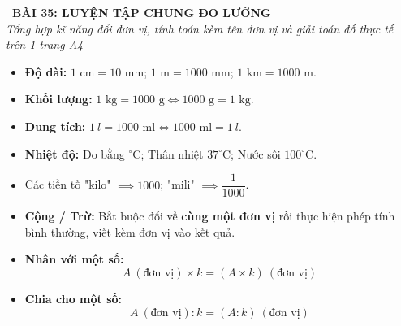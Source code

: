 \documentclass[11pt,a4paper]{article}
\begin{document}
\begin{tcolorbox}[
  enhanced,
  colback=white,
  colframe=primary,
  arc=3mm,
  boxrule=1.2pt,
  left=4mm, right=4mm, top=2.5mm, bottom=2.5mm,
  drop shadow=black!10!white
]
  \centering
  {\Large\bfseries\color{primary}\faBookmark\ BÀI 35: LUYỆN TẬP CHUNG ĐO LƯỜNG}\\[1.5mm]
  {\small\itshape\color{black!75}Tổng hợp kĩ năng đổi đơn vị, tính toán kèm tên đơn vị và giải toán đố thực tế trên 1 trang A4}
\end{tcolorbox}

\vspace{-2mm}


\noindent
\begin{minipage}[t]{0.49\textwidth}\vspace{0pt}
\begin{tcolorbox}[
  enhanced,
  colback=blue!4!white,
  colframe=blue!75!black,
  arc=2mm, boxrule=0.8pt,
  left=2mm, right=2mm, top=1.8mm, bottom=1.8mm,
  title={\footnotesize\bfseries\color{white}\faKey\ 1. Ma trận 4 bảng đổi đơn vị cốt lõi}
]
{\footnotesize
\begin{itemize}\setlength{\itemsep}{1.5pt}\setlength{\leftskip}{-2.5mm}
  \item \textbf{Độ dài:} $1\text{ cm} = 10\text{ mm}$; $1\text{ m} = 1000\text{ mm}$; $1\text{ km} = 1000\text{ m}$.
  \item \textbf{Khối lượng:} $1\text{ kg} = 1000\text{ g} \iff 1000\text{ g} = 1\text{ kg}$.
  \item \textbf{Dung tích:} $1\ l = 1000\text{ ml} \iff 1000\text{ ml} = 1\ l$.
  \item \textbf{Nhiệt độ:} Đo bằng $^\circ\text{C}$; Thân nhiệt $37^\circ\text{C}$; Nước sôi $100^\circ\text{C}$.
  \item Các tiền tố "kilo" $\implies 1000$; "mili" $\implies \dfrac{1}{1000}$.
\end{itemize}
}
\end{tcolorbox}
\end{minipage}
\hfill
\begin{minipage}[t]{0.49\textwidth}\vspace{0pt}
\begin{tcolorbox}[
  enhanced,
  colback=teal!4!white,
  colframe=teal!75!black,
  arc=2mm, boxrule=0.8pt,
  left=2mm, right=2mm, top=1.8mm, bottom=1.8mm,
  title={\footnotesize\bfseries\color{white}\faCheckSquare\ 2. Kĩ năng thực hiện phép tính}
]
{\footnotesize
\begin{itemize}\setlength{\itemsep}{1.5pt}\setlength{\leftskip}{-2.5mm}
  \item \textbf{Cộng / Trừ:} Bắt buộc đổi về \textbf{cùng một đơn vị} rồi thực hiện phép tính bình thường, viết kèm đơn vị vào kết quả.
  \item \textbf{Nhân với một số:}
  $$A\ (\text{đơn vị}) \times k = (A \times k)\ (\text{đơn vị})$$
  \item \textbf{Chia cho một số:}
  $$A\ (\text{đơn vị}) : k = (A : k)\ (\text{đơn vị})$$
\end{itemize}
}
\end{tcolorbox}
\end{minipage}
\end{document}
